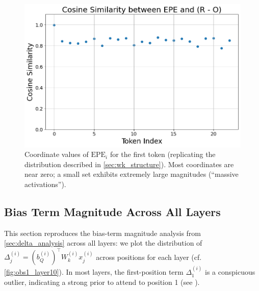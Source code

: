 \documentclass[11pt]{article}
\begin{document}
\begin{figure}[t]
  \includegraphics[width=\columnwidth]{figures/epe_exp.png}
  \caption{Coordinate values of $\mathrm{EPE}_i$ for the first token (replicating the distribution described in \cref{sec:wk_structure}). Most coordinates are near zero; a small set exhibits extremely large magnitudes (``massive activations'').}
  \label{fig:epe_exp}
\end{figure}

\subsection{Bias Term Magnitude Across All Layers}\label{app:bias_term}

This section reproduces the bias-term magnitude analysis from \cref{sec:delta_analysis} across all layers: we plot the distribution of $\Delta_j^{(i)}=(b_Q^{(i)})^\top W_k^{(i)} x_j^{(i)}$ across positions for each layer (cf. \cref{fig:obs1_layer10}). In most layers, the first-position term $\Delta_1^{(i)}$ is a conspicuous outlier, indicating a strong prior to attend to position 1 (see ).
\end{document}
